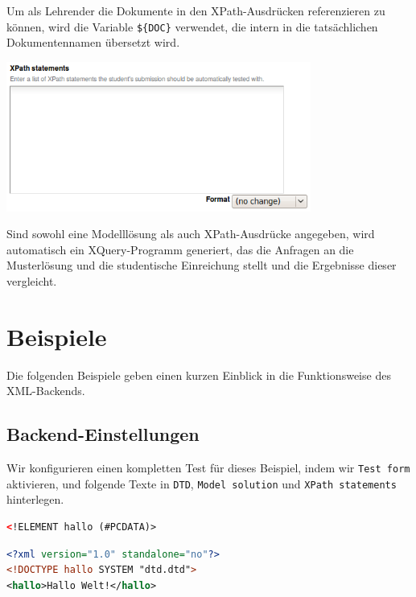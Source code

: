 \documentclass[a4paper]{scrartcl}
\newcommand{\anf}[1]{\glqq{}#1\grqq{}}
\begin{document}
      Um als Lehrender die Dokumente in den XPath-Ausdrücken referenzieren zu können, wird die Variable \anf{\texttt{\$\{DOC\}}} verwendet, die intern in die tatsächlichen Dokumentennamen übersetzt wird.

      \begin{center}
        \captionsetup{type=figure}
	      \includegraphics[width=0.75\textwidth]{images/XPath.png}
	      \label{fig:xpath}
      \end{center}
      Sind sowohl eine Modelllösung als auch XPath-Ausdrücke angegeben, wird automatisch ein XQuery-Programm generiert, das die Anfragen an die Musterlösung und die studentische Einreichung stellt und die Ergebnisse dieser vergleicht.
  	  
	\section{Beispiele}
	  Die folgenden Beispiele geben einen kurzen Einblick in die Funktionsweise des XML-Backends.
	  \subsection{Backend-Einstellungen}
	  Wir konfigurieren einen kompletten Test für dieses Beispiel, indem wir \anf{\texttt{Test form}} aktivieren, und folgende Texte in \anf{\texttt{DTD}}, \anf{\texttt{Model solution}} und \anf{\texttt{XPath statements}} hinterlegen.
	  
\begin{lstlisting}[language=XML, captionpos=b, frame=tlRB, caption={Beispiel DTD.}]
<!ELEMENT hallo (#PCDATA)>
\end{lstlisting}

\begin{lstlisting}[language=XML, captionpos=b, frame=tlRB, caption=Modelllösung.]
<?xml version="1.0" standalone="no"?>
<!DOCTYPE hallo SYSTEM "dtd.dtd">
<hallo>Hallo Welt!</hallo>
\end{lstlisting}
\end{document}

